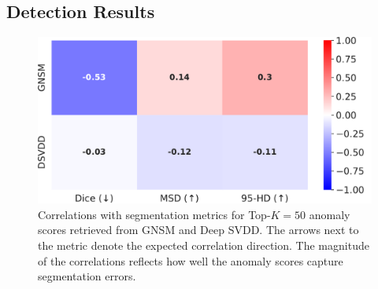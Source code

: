 \subsection*{Detection Results}
\label{seg_results}

\begin{figure}[htbp]
  \centering
  \includegraphics[width=0.7\columnwidth]{figures/voc_heatmap.pdf}
  \caption{Correlations with segmentation metrics for Top-$K=50$ anomaly scores retrieved from GNSM and Deep SVDD. The arrows next to the metric denote the expected correlation direction. The magnitude of the correlations reflects how well the anomaly scores capture segmentation errors.}
\label{corrs}
\end{figure}

